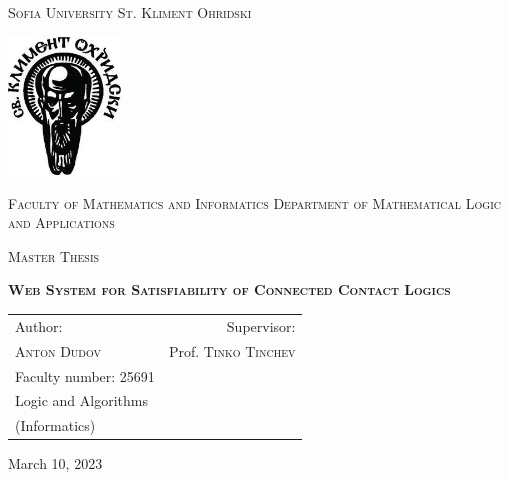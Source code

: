 \documentclass{article}
\begin{document}
\begin{titlepage}
	\begin{center}

	\Large\textsc{Sofia University St. Kliment Ohridski}

	\vspace{0.5cm}

	\includegraphics[width=3cm]{su_logo}

	\vspace{1.5cm}

	\Large
	\textsc{Faculty of Mathematics and Informatics}
	\textsc{Department of Mathematical Logic and Applications}

	\vspace{1.5cm}

	\Large\textsc{Master Thesis}

	\vspace{0.5cm}

	{\huge\bfseries{\textsc{Web System for Satisfiability of Connected Contact Logics}}}

	\vspace{2.5cm}

	\large
	\begin{tabularx}{\textwidth}{Xr}
		Author:                  &  Supervisor:                  \\
		\textsc{Anton Dudov}     &  Prof. \textsc{Tinko Tinchev} \\
		Faculty number: 25691    &                               \\
		Logic and Algorithms     &                               \\
		(Informatics)            &                               \\
	\end{tabularx}

	\vfill
	March 10, 2023

    \end{center}
\end{titlepage}

	\thispagestyle{empty}
	\newpage

	\tableofcontents
	\newpage
\end{document}
